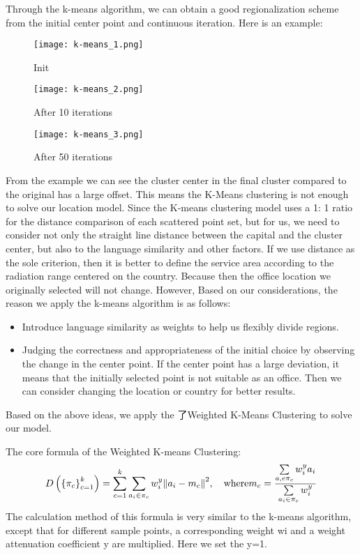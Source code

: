 \documentclass[12pt]{article}  %
\begin{document}
Through the k-means algorithm, we can obtain a good regionalization scheme from the initial center point and continuous iteration. Here is an example:

\begin{figure}[H]
	\begin{minipage}[t]{0.3\linewidth}
		\centering
		\texttt{[image: k-means\_1.png]}
		\caption{Init}
	\end{minipage}%
	\hfill
	\begin{minipage}[t]{0.3\linewidth}
		\centering
		\texttt{[image: k-means\_2.png]}
		\caption{After 10 iterations}
	\end{minipage}
	\hfill
	\begin{minipage}[t]{0.3\linewidth}
		\centering
		\texttt{[image: k-means\_3.png]}
		\caption{After 50 iterations}
	\end{minipage}
\end{figure}

From the example we can see the cluster center in the final cluster compared to the original has a large offset. This means the K-Means clustering is not enough to solve our location model. Since the K-means clustering model uses a 1: 1 ratio for the distance comparison of each scattered point set, but for us, we need to consider not only the straight line distance between the capital and the cluster center, but also to the language similarity and other factors. If we use distance as the sole criterion, then it is better to define the service area according to the radiation range centered on the country. Because then the office location we originally selected will not change. However, Based on our considerations, the reason we apply the k-means algorithm is as follows:
\begin{itemize}
	\item Introduce language similarity as weights to help us flexibly divide regions.
	\item Judging the correctness and appropriateness of the initial choice by observing the change in the center point. If the center point has a large deviation, it means that the initially selected point is not suitable as an office. Then we can consider changing the location or country for better results.
\end{itemize}

Based on the above ideas, we apply the 了Weighted K-Means Clustering to solve our model.

The core formula of the Weighted K-means Clustering:
\begin{equation}
D\left( {\left\{ {{\pi _c}} \right\}_{c = 1}^k} \right) = \sum\limits_{c = 1}^k {\sum\limits_{{a_i} \in {\pi _c}} {w_i^y} } {\left\| {{a_i} - {m_c}} \right\|^2},\quad {\rm{ where }}{m_c} = \frac{{\sum\limits_{a,e{\pi _c}} {w_i^y} {a_i}}}{{\sum\limits_{{a_i} \in {\pi _c}} {w_i^y} }}
\end{equation}
The calculation method of this formula is very similar to the k-means algorithm, except that for different sample points, a corresponding weight wi and a weight attenuation coefficient y are multiplied. Here we set the y=1.
\end{document}
